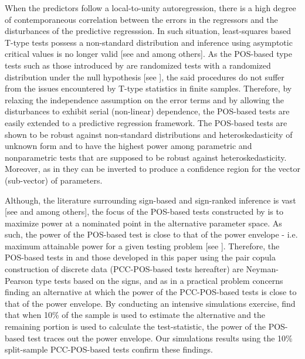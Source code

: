 \documentclass[harvard,11pt]{article}
\begin{document}
 When the predictors follow a local-to-unity autoregression, there is a high degree of contemporaneous correlation between the errors in the regressors and the disturbances of the predictive regresssion. In such situation, least-squares based T-type tests possess a non-standard distribution and inference using asymptotic critical values is no longer valid [see \citet{mankiw1986we} and \citet{stambaugh1999predictive} among others]. As the POS-based type tests such as those introduced by \citet{dufour2010exact} are randomized tests with a randomized distribution under the null hypothesis [see \citet{pratt2012concepts}], the said procedures do not suffer from the issues encountered by T-type statistics in finite samples. Therefore, by relaxing the independence assumption on the error terms and by allowing the disturbances to exhibit serial (non-linear) dependence, the POS-based tests are easily extended to a predictive regression framework. The POS-based tests are shown to be robust against non-standard distributions and heteroskedasticity of unknown form and to have the highest power among parametric and nonparametric tests that are supposed to be robust against heteroskedasticity. Moreover, as in \citet{dufour2010exact} they can be inverted to produce a confidence region for the vector (sub-vector) of parameters.  

Although, the literature surrounding sign-based and sign-ranked inference is vast [see \citet{taamouti2015finite} and \citet{boldin1997sign} among others], the focus of the POS-based tests constructed by \citet{dufour2010exact} is to maximize power at a nominated point in the alternative parameter space. As such, the power of the POS-based test is close to that of the power envelope - i.e. maximum attainable power for a given testing problem [see \citet{king1987towards}]. Therefore, the POS-based tests in \citet{dufour2010exact} and those developed in this paper using the pair copula construction of discrete data (PCC-POS-based tests hereafter) are Neyman-Pearson type tests based on the signs, and as in \citet{dufour2010exact} a practical problem concerns finding an alternative at which the power of the PCC-POS-based tests is close to that of the power envelope. By  conducting an intensive simulations exercise, \citet{dufour2010exact}  find that when 10\% of the sample is used to estimate the alternative and the remaining portion is used to calculate the test-statistic, the power of the POS-based test traces out the power envelope. Our simulations results using the 10\% split-sample PCC-POS-based tests confirm these findings.
\end{document}

